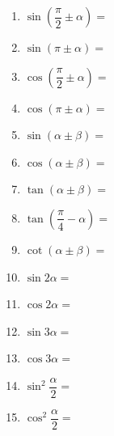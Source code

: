\documentclass[a4paper,12pt]{article}
\begin{document}
    \vspace{1em}

    \begin{minipage}[t]{0.30\textwidth}
        \begin{enumerate}[leftmargin=*, itemsep=1.4em]
            \item $\sin (\dfrac{\pi}{2} \pm \alpha) =$
            \item $\sin (\pi \pm \alpha) =$
            \item $\cos (\dfrac{\pi}{2} \pm \alpha) =$
            \item $\cos (\pi \pm \alpha) =$
            \item $\sin (\alpha \pm \beta) =$

        \end{enumerate}
    \end{minipage}
    \hfill
    \begin{minipage}[t]{0.30\textwidth}
        \begin{enumerate}[leftmargin=*, itemsep=1.4em]
            \setcounter{enumi}{5}
            \item $\cos (\alpha \pm \beta) =$
            \item $\tan (\alpha \pm \beta) =$
            \item $\tan (\dfrac{\pi}{4} - \alpha) =$
            \item $\cot (\alpha \pm \beta) =$
            \item $\sin 2\alpha =$
        \end{enumerate}
    \end{minipage}
    \hfill
    \begin{minipage}[t]{0.30\textwidth}
        \begin{enumerate}[leftmargin=*, itemsep=1.4em]
            \setcounter{enumi}{10}
            \item $\cos 2\alpha =$
            \item $\sin 3\alpha =$
            \item $\cos 3\alpha =$
            \item $\sin^2 \dfrac{\alpha}{2} =$
            \item $\cos^2 \dfrac{\alpha}{2} =$
        \end{enumerate}
    \end{minipage}
\end{document}
